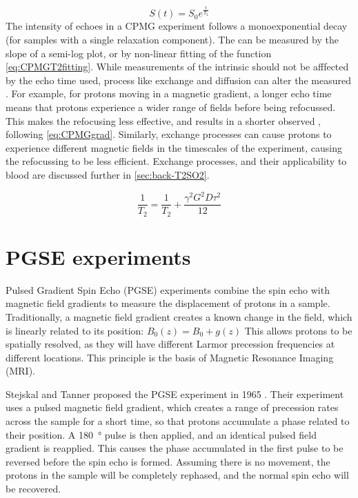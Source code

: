 \begin{equation}
S(t) = S_0 e^{\frac{t}{T_2}}
\label{eq:CPMGT2fitting}
\end{equation}
The intensity of echoes in a CPMG experiment follows a monoexponential decay (for samples with a single relaxation component).
The \Ttwo can be measured by the slope of a semi-log plot, or by non-linear fitting of the function \ref{eq:CPMGT2fitting}.
While measurements of the intrinsic \Ttwo should not be afffected by the echo time used, process like exchange and diffusion can alter the measured \Ttwo.
For example, for protons moving in a magnetic gradient, a longer echo time means that protons experience a wider range of \Bzero fields before being refocussed.
This makes the refocusing less effective, and results in a shorter observed \Ttwo, following \autoref{eq:CPMGgrad}.
Similarly, exchange processes can cause protons to experience different magnetic fields in the timescales of the experiment, causing the refocussing to be less efficient.
Exchange processes, and their applicability to blood are discussed further in \autoref{sec:back-T2SO2}.

\begin{equation}
\frac{1}{T_2} = \frac{1}{T_2} + \frac{\gamma^2 G^2 D \tau^2}{12}
\label{eq:CPMGgrad}
\end{equation}

\section{PGSE experiments}
\label{sec:back-PGSE}
Pulsed Gradient Spin Echo (PGSE) experiments combine the spin echo with magnetic field gradients to measure the displacement of protons in a sample.
Traditionally, a magnetic field gradient creates a known change in the \Bzero field, which is linearly related to its position: $B_0(z) = B_0 + g(z)$
This allows protons to be spatially resolved, as they will have different Larmor precession frequencies at different locations.
This principle is the basis of Magnetic Resonance Imaging (MRI).

Stejskal and Tanner proposed the PGSE experiment in 1965 \cite{StejskalSpinDiffusionMeasurements1965}.
Their experiment uses a pulsed magnetic field gradient, which creates a range of precession rates across the sample for a short time, so that protons accumulate a phase related to their position.
A \SI{180}{\degree} pulse is then applied, and an identical pulsed field gradient is reapplied.
This causes the phase accumulated in the first pulse to be reversed before the spin echo is formed.
Assuming there is no movement, the protons in the sample will be completely rephased, and the normal spin echo will be recovered.

